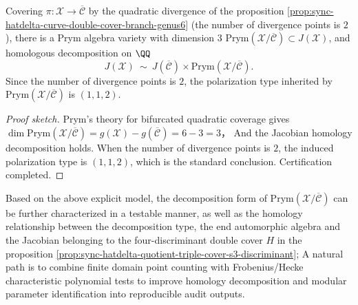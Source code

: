 \begin{corollary}\label{cor:sync-hatdelta-prym-decomposition}
Covering \(\pi:\mathcal{X}\to\overline{\mathcal{C}}\) by the quadratic divergence of the proposition \ref{prop:sync-hatdelta-curve-double-cover-branch-genus6} (the number of divergence points is \(2\)), there is a Prym algebra variety with dimension \(3\)
\(\mathrm{Prym}(\mathcal{X}/\overline{\mathcal{C}})\subset J(\mathcal{X})\), and homologous decomposition on \(\QQ\)
\[
J(\mathcal{X})\ \sim\ J(\overline{\mathcal{C}})\times \mathrm{Prym}(\mathcal{X}/\overline{\mathcal{C}}).
\]
Since the number of divergence points is \(2\), the polarization type inherited by \(\mathrm{Prym}(\mathcal{X}/\overline{\mathcal{C}})\) is \((1,1,2)\).
\end{corollary}
\begin{proof}[Proof sketch]
Prym's theory for bifurcated quadratic coverage gives
\(\dim\mathrm{Prym}(\mathcal{X}/\overline{\mathcal{C}})=g(\mathcal{X})-g(\overline{\mathcal{C}})=6-3=3\)，
And the Jacobian homology decomposition holds.
When the number of divergence points is \(2\), the induced polarization type is \((1,1,2)\), which is the standard conclusion.
Certification completed.
\end{proof}

\par
Based on the above explicit model, the decomposition form of \(\mathrm{Prym}(\mathcal{X}/\overline{\mathcal{C}})\) can be further characterized in a testable manner, as well as the homology relationship between the decomposition type, the end automorphic algebra and the Jacobian belonging to the four-discriminant double cover \(H\) in the proposition \ref{prop:sync-hatdelta-quotient-triple-cover-s3-discriminant};
A natural path is to combine finite domain point counting with Frobenius/Hecke characteristic polynomial tests to improve homology decomposition and modular parameter identification into reproducible audit outputs.
